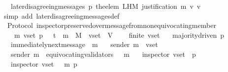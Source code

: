 \begin{isabellebody}
\ \ {\isasymlongrightarrow}\ later{\isacharunderscore}disagreeing{\isacharunderscore}messages\ {\isacharparenleft}p{\isacharcomma}\ {\isacharparenleft}the{\isacharunderscore}elem\ {\isacharparenleft}L{\isacharunderscore}H{\isacharunderscore}M\ {\isacharparenleft}justification\ m{\isacharparenright}\ v{\isacharparenright}{\isacharparenright}{\isacharcomma}\ v{\isacharcomma}\ {\isasymsigma}{\isacharparenright}\ {\isacharequal}\ {\isasymemptyset}{\isachardoublequoteclose}\isanewline
%
\isadelimproof
\ \ %
\endisadelimproof
%
\isatagproof
{}\isamarkupfalse%
\ {\isacharparenleft}simp\ add{\isacharcolon}\ later{\isacharunderscore}disagreeing{\isacharunderscore}messages{\isacharunderscore}def{\isacharparenright}\isanewline
\ \ \isamarkupfalse%
%
\endisatagproof
{\isafoldproof}%
%
\isadelimproof
\isanewline
%
\endisadelimproof
\isanewline
\isanewline
\isanewline
{}\isamarkupfalse%
\ {\isacharparenleft}\ Protocol{\isacharparenright}\ inspector{\isacharunderscore}preserved{\isacharunderscore}over{\isacharunderscore}message{\isacharunderscore}from{\isacharunderscore}non{\isacharunderscore}equivocating{\isacharunderscore}member\ {\isacharcolon}\isanewline
\ \ {\isachardoublequoteopen}{\isasymforall}\ {\isasymsigma}\ m\ v{\isacharunderscore}set\ p{\isachardot}\ {\isasymsigma}\ {\isasymin}\ {\isasymSigma}t\ {\isasymand}\ m\ {\isasymin}\ M\ {\isasymand}\ v{\isacharunderscore}set\ {\isasymsubseteq}\ V\ \isanewline
\ \ {\isasymlongrightarrow}\ finite\ v{\isacharunderscore}set\isanewline
\ \ {\isasymlongrightarrow}\ majority{\isacharunderscore}driven\ p\isanewline
\ \ {\isasymlongrightarrow}\ immediately{\isacharunderscore}next{\isacharunderscore}message\ {\isacharparenleft}{\isasymsigma}{\isacharcomma}\ m{\isacharparenright}\isanewline
\ \ {\isasymlongrightarrow}\ sender\ m\ {\isasymin}\ v{\isacharunderscore}set\isanewline
\ \ {\isasymlongrightarrow}\ sender\ m\ {\isasymnotin}\ equivocating{\isacharunderscore}validators\ {\isacharparenleft}{\isasymsigma}\ {\isasymunion}\ {\isacharbraceleft}m{\isacharbraceright}{\isacharparenright}\isanewline
\ \ {\isasymlongrightarrow}\ inspector\ {\isacharparenleft}v{\isacharunderscore}set{\isacharcomma}\ {\isasymsigma}{\isacharcomma}\ p{\isacharparenright}\ \isanewline
\ \ {\isasymlongrightarrow}\ inspector\ {\isacharparenleft}v{\isacharunderscore}set{\isacharcomma}\ {\isasymsigma}\ {\isasymunion}\ {\isacharbraceleft}m{\isacharbraceright}{\isacharcomma}\ p{\isacharparenright}{\isachardoublequoteclose}\isanewline
%
\isadelimproof
\ \ %
\endisadelimproof
%
\isatagproof
{}\isamarkupfalse%

\end{isabellebody}
